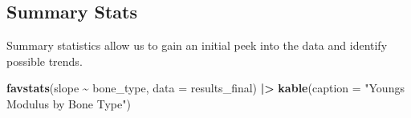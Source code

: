 \documentclass[
]{article}
\newenvironment{Shaded}{\begin{snugshade}}{\end{snugshade}}
\newcommand{\AttributeTok}[1]{\textcolor[rgb]{0.13,0.29,0.53}{#1}}
\newcommand{\FunctionTok}[1]{\textcolor[rgb]{0.13,0.29,0.53}{\textbf{#1}}}
\newcommand{\NormalTok}[1]{#1}
\newcommand{\SpecialCharTok}[1]{\textcolor[rgb]{0.81,0.36,0.00}{\textbf{#1}}}
\newcommand{\StringTok}[1]{\textcolor[rgb]{0.31,0.60,0.02}{#1}}
\begin{document}
\subsection{Summary Stats}\label{summary-stats}

Summary statistics allow us to gain an initial peek into the data and
identify possible trends.

\begin{Shaded}
\begin{Highlighting}[]
\FunctionTok{favstats}\NormalTok{(slope }\SpecialCharTok{\textasciitilde{}}\NormalTok{ bone\_type, }\AttributeTok{data =}\NormalTok{ results\_final) }\SpecialCharTok{|\textgreater{}}
  \FunctionTok{kable}\NormalTok{(}\AttributeTok{caption =} \StringTok{"Youngs Modulus by Bone Type"}\NormalTok{)}
\end{Highlighting}
\end{Shaded}
\end{document}
